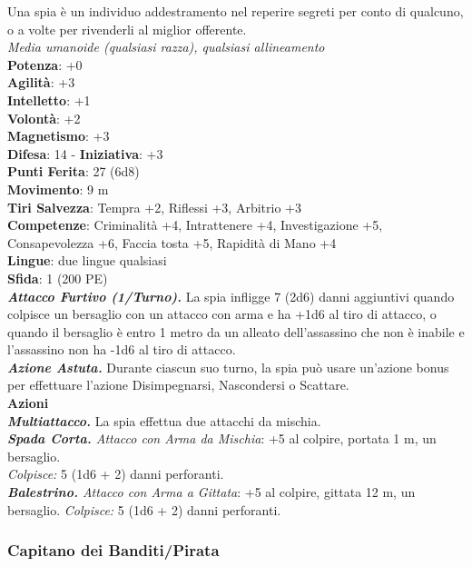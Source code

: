 \begin{multicols}{2}
Una spia è un individuo addestramento nel reperire segreti per conto di qualcuno, o a volte per rivenderli al miglior offerente.\\
\emph{Media umanoide (qualsiasi razza), qualsiasi allineamento}\\
\textbf{Potenza}: +0\\
\textbf{Agilità}: +3\\
\textbf{Intelletto}: +1\\
\textbf{Volontà}: +2\\
\textbf{Magnetismo}: +3\\
\textbf{Difesa}: 14 - \textbf{Iniziativa}: +3\\
\textbf{Punti Ferita}: 27 (6d8)\\
\textbf{Movimento}: 9 m\\
\textbf{Tiri Salvezza}: Tempra +2, Riflessi +3, Arbitrio +3 \\
\textbf{Competenze}: Criminalità +4, Intrattenere +4, Investigazione +5, Consapevolezza +6, Faccia tosta +5, Rapidità di Mano +4\\
\textbf{Lingue}: due lingue qualsiasi\\
\textbf{Sfida}: 1 (200 PE)\smallskip\\
\emph{\textbf{Attacco Furtivo (1/Turno).}} La spia infligge 7 (2d6) danni aggiuntivi quando colpisce un bersaglio con un attacco con arma e ha +1d6 al tiro di attacco, o quando il bersaglio è entro 1 metro da un alleato dell'assassino che non è inabile e l'assassino non ha -1d6 al tiro di attacco.\\
\emph{\textbf{Azione Astuta.}} Durante ciascun suo turno, la spia può usare un'azione bonus per effettuare l'azione Disimpegnarsi, Nascondersi o Scattare.\\
\smallskip\textbf{Azioni} \\
\emph{\textbf{Multiattacco.}} La spia effettua due attacchi da mischia. \\
\emph{\textbf{Spada Corta.} Attacco con Arma da Mischia}: +5 al colpire, portata 1 m, un bersaglio.\\
\emph{Colpisce:} 5 (1d6 + 2) danni perforanti.\\
\emph{\textbf{Balestrino.} Attacco con Arma a Gittata}: +5 al colpire, gittata 12 m, un bersaglio. \emph{Colpisce:} 5 (1d6 + 2) danni perforanti.\\


\subsubsection{Capitano dei Banditi/Pirata}


\end{multicols}
